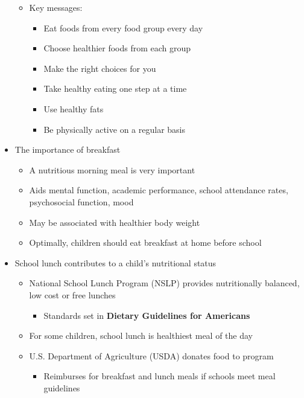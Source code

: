 \documentclass[12pt]{article}
\begin{document}
\begin{itemize}
\begin{itemize}
                        \item Key messages:
                            \begin{itemize}
                                \item Eat foods from every food group every day
                                \item Choose healthier foods from each group
                                \item Make the right choices for you
                                \item Take healthy eating one step at a time
                                \item Use healthy fats
                                \item Be physically active on a regular basis
                            \end{itemize}
                    \end{itemize}
                \item The importance of breakfast
                    \begin{itemize}
                        \item A nutritious morning meal is very important
                        \item Aids mental function, academic performance, school attendance rates, psychosocial function, mood
                        \item May be associated with healthier body weight
                        \item Optimally, children should eat breakfast at home before school
                    \end{itemize}
                \item School lunch contributes to a child's nutritional status
                    \begin{itemize}
                        \item National School Lunch Program (NSLP) provides nutritionally balanced, low cost or free lunches
                            \begin{itemize}
                                \item Standards set in \textbf{Dietary Guidelines for Americans}
                            \end{itemize}
                        \item For some children, school lunch is healthiest meal of the day
                        \item U.S. Department of Agriculture (USDA) donates food to program
                            \begin{itemize}
                                \item Reimburses for breakfast and lunch meals if schools meet meal guidelines
                            \end{itemize}
                    \end{itemize}
            \end{itemize}
\end{document}
